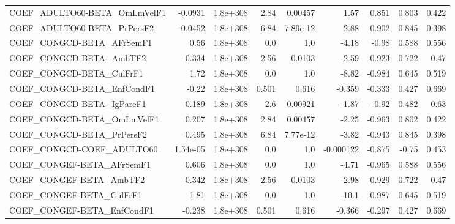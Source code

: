 \begin{tabular}{lrrrrrrrr}
COEF\_ADULTO60-BETA\_OmLmVelF1          &     -0.0931 &     1.8e+308 &    2.84 &  0.00457 &       1.57 &       0.851 &        0.803 &         0.422 \\
COEF\_ADULTO60-BETA\_PrPersF2           &     -0.0452 &     1.8e+308 &    6.84 & 7.89e-12 &       2.88 &       0.902 &        0.845 &         0.398 \\
COEF\_CONGCD-BETA\_AFrSemF1             &        0.56 &     1.8e+308 &     0.0 &      1.0 &      -4.18 &       -0.98 &        0.588 &         0.556 \\
COEF\_CONGCD-BETA\_AmbTF2               &       0.334 &     1.8e+308 &    2.56 &   0.0103 &      -2.59 &      -0.923 &        0.722 &          0.47 \\
COEF\_CONGCD-BETA\_CulFrF1              &        1.72 &     1.8e+308 &     0.0 &      1.0 &      -8.82 &      -0.984 &        0.645 &         0.519 \\
COEF\_CONGCD-BETA\_EnfCondF1            &       -0.22 &     1.8e+308 &   0.501 &    0.616 &     -0.359 &      -0.333 &        0.427 &         0.669 \\
COEF\_CONGCD-BETA\_IgPareF1             &       0.189 &     1.8e+308 &     2.6 &  0.00921 &      -1.87 &       -0.92 &        0.482 &          0.63 \\
COEF\_CONGCD-BETA\_OmLmVelF1            &       0.207 &     1.8e+308 &    2.84 &  0.00457 &      -2.25 &      -0.963 &        0.802 &         0.422 \\
COEF\_CONGCD-BETA\_PrPersF2             &       0.495 &     1.8e+308 &    6.84 & 7.77e-12 &      -3.82 &      -0.943 &        0.845 &         0.398 \\
COEF\_CONGCD-COEF\_ADULTO60             &    1.54e-05 &     1.8e+308 &     0.0 &      1.0 &  -0.000122 &      -0.875 &        -0.75 &         0.453 \\
COEF\_CONGEF-BETA\_AFrSemF1             &       0.606 &     1.8e+308 &     0.0 &      1.0 &      -4.71 &      -0.965 &        0.588 &         0.556 \\
COEF\_CONGEF-BETA\_AmbTF2               &       0.342 &     1.8e+308 &    2.56 &   0.0103 &      -2.98 &      -0.929 &        0.722 &          0.47 \\
COEF\_CONGEF-BETA\_CulFrF1              &        1.81 &     1.8e+308 &     0.0 &      1.0 &      -10.1 &      -0.987 &        0.645 &         0.519 \\
COEF\_CONGEF-BETA\_EnfCondF1            &      -0.238 &     1.8e+308 &   0.501 &    0.616 &     -0.366 &      -0.297 &        0.427 &         0.669 \\

\end{tabular}
